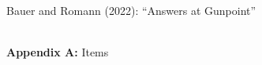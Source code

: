 \documentclass[xcolor=table,9pt,aspectratio=169]{beamer}
\begin{document}
\begin{frame}{\vspace*{10mm}Bauer and Romann (2022): ``Answers at Gunpoint''}
\vspace*{-5mm}
\begin{center}
   \\
   {\footnotesize\textbf{Appendix A:} Items}\\
\end{center}
\end{frame}
\end{document}
